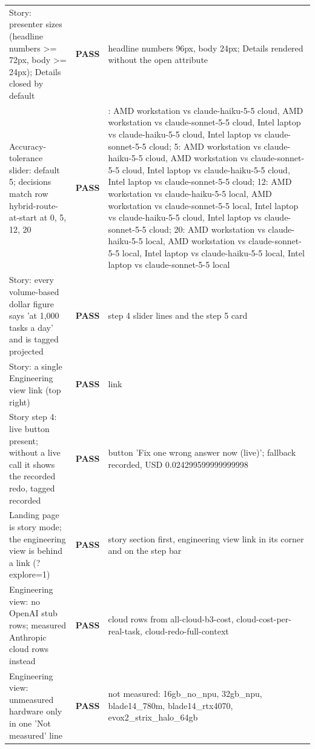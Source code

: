 \begin{longtable}{>{\raggedright\arraybackslash}p{}p{}>{\raggedright\arraybackslash}p{}}
Story: presenter sizes (headline numbers \textgreater{}= 72px, body \textgreater{}= 24px); Details closed by default & \textbf{PASS} & headline numbers 96px, body 24px; Details rendered without the open attribute \\

Accuracy-tolerance slider: default 5; decisions match row hybrid-route-at-start at 0, 5, 12, 20 & \textbf{PASS} & 0: AMD workstation vs claude-haiku-5-5 cloud, AMD workstation vs claude-sonnet-5-5 cloud, Intel laptop vs claude-haiku-5-5 cloud, Intel laptop vs claude-sonnet-5-5 cloud; 5: AMD workstation vs claude-haiku-5-5 cloud, AMD workstation vs claude-sonnet-5-5 cloud, Intel laptop vs claude-haiku-5-5 cloud, Intel laptop vs claude-sonnet-5-5 cloud; 12: AMD workstation vs claude-haiku-5-5 local, AMD workstation vs claude-sonnet-5-5 local, Intel laptop vs claude-haiku-5-5 cloud, Intel laptop vs claude-sonnet-5-5 cloud; 20: AMD workstation vs claude-haiku-5-5 local, AMD workstation vs claude-sonnet-5-5 local, Intel laptop vs claude-haiku-5-5 local, Intel laptop vs claude-sonnet-5-5 local \\

Story: every volume-based dollar figure says 'at 1,000 tasks a day' and is tagged projected & \textbf{PASS} & step 4 slider lines and the step 5 card \\

Story: a single Engineering view link (top right) & \textbf{PASS} & 1 link \\

Story step 4: live button present; without a live call it shows the recorded redo, tagged recorded & \textbf{PASS} & button 'Fix one wrong answer now (live)'; fallback recorded, USD 0.024299599999999998 \\

Landing page is story mode; the engineering view is behind a link (?explore=1) & \textbf{PASS} & story section first, engineering view link in its corner and on the step bar \\

Engineering view: no OpenAI stub rows; measured Anthropic cloud rows instead & \textbf{PASS} & 5 cloud rows from all-cloud-b3-cost, cloud-cost-per-real-task, cloud-redo-full-context \\

Engineering view: unmeasured hardware only in one 'Not measured' line & \textbf{PASS} & not measured: 16gb\_no\_npu, 32gb\_npu, blade14\_780m, blade14\_rtx4070, evox2\_strix\_halo\_64gb \\


\end{longtable}
